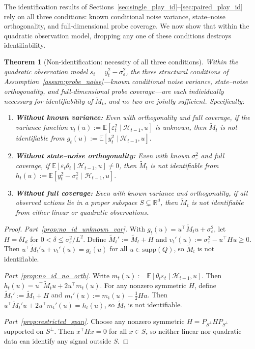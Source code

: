 \documentclass[12pt]{article}
\newcommand{\R}{\mathbb{R}}
\newcommand{\E}{\mathbb{E}}
\newcommand{\cH}{\mathcal{H}}
\newcommand{\supp}{\mathrm{supp}}
\newtheorem{theorem}{Theorem}
\theoremstyle{plain}
\theoremstyle{definition}
\begin{document}
The identification results of Sections~\ref{sec:single_play_id}--\ref{sec:paired_play_id} rely on all three conditions: known conditional noise variance, state--noise orthogonality, and full-dimensional probe coverage. We now show that within the quadratic observation model, dropping any one of these conditions destroys identifiability.

\begin{theorem}[Non-identification: necessity of all three conditions]
\label{thm:non_identification}
Within the quadratic observation model $s_t = y_t^2 - \sigma_\varepsilon^2$, the three structural conditions of Assumption~\ref{assum:probe_noise}---known conditional noise variance, state--noise orthogonality, and full-dimensional probe coverage---are each individually necessary for identifiability of $\widetilde{M}_t$, and no two are jointly sufficient. Specifically:
\begin{enumerate}[label=(\roman*)]
\item \label{prop:no_id_unknown_var} \textbf{Without known variance:} Even with orthogonality and full coverage, if the variance function $v_t(u) := \E[\varepsilon_t^2 \mid \cH_{t-1}, u]$ is unknown, then $\widetilde{M}_t$ is not identifiable from $g_t(u) := \E[y_t^2 \mid \cH_{t-1}, u]$.
\item \label{prop:no_id_no_orth} \textbf{Without state--noise orthogonality:} Even with known $\sigma_\varepsilon^2$ and full coverage, if $\E[\varepsilon_t \theta_t \mid \cH_{t-1}, u] \neq 0$, then $\widetilde{M}_t$ is not identifiable from $h_t(u) := \E[y_t^2 - \sigma_\varepsilon^2 \mid \cH_{t-1}, u]$.
\item \label{prop:restricted_span} \textbf{Without full coverage:} Even with known variance and orthogonality, if all observed actions lie in a proper subspace $S \subsetneq \R^d$, then $\widetilde{M}_t$ is not identifiable from either linear or quadratic observations.
\end{enumerate}
\end{theorem}

\begin{proof}
\emph{Part~\ref{prop:no_id_unknown_var}.}
With $g_t(u) = u^\top \widetilde{M}_t u + \sigma_\varepsilon^2$, let $H = \delta I_d$ for $0 < \delta \le \sigma_\varepsilon^2 / L^2$. Define $\widetilde{M}_t' := \widetilde{M}_t + H$ and $v_t'(u) := \sigma_\varepsilon^2 - u^\top H u \ge 0$. Then $u^\top \widetilde{M}_t' u + v_t'(u) = g_t(u)$ for all $u \in \supp(Q)$, so $\widetilde{M}_t$ is not identifiable.

\emph{Part~\ref{prop:no_id_no_orth}.}
Write $m_t(u) := \E[\theta_t \varepsilon_t \mid \cH_{t-1}, u]$. Then $h_t(u) = u^\top \widetilde{M}_t u + 2u^\top m_t(u)$. For any nonzero symmetric $H$, define $\widetilde{M}_t' := \widetilde{M}_t + H$ and $m_t'(u) := m_t(u) - \frac{1}{2}Hu$. Then $u^\top \widetilde{M}_t' u + 2u^\top m_t'(u) = h_t(u)$, so $\widetilde{M}_t$ is not identifiable.

\emph{Part~\ref{prop:restricted_span}.}
Choose any nonzero symmetric $H = P_{S^\perp} H P_{S^\perp}$ supported on $S^\perp$. Then $x^\top H x = 0$ for all $x \in S$, so neither linear nor quadratic data can identify any signal outside $S$.
\end{proof}
\end{document}
